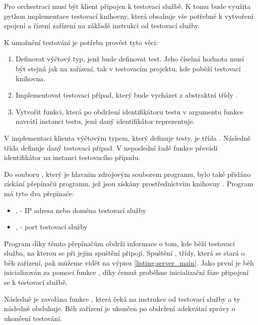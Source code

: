 Pro orchestraci musí být klient připojen k testovací službě. K tomu bude využita python implementace testovací knihovny, která obsahuje vše potřebné k vytvoření spojení a řízení zařízení na základě instrukcí od testovací služby. 

K umožnění testování je potřeba provést tyto věci:

\begin{enumerate}
    \item Definovat výčtový typ, jenž bude definovat test. Jeho číselná hodnota musí být stejná jak na zařízení, tak v testovacím projektu, kde poběží testovací knihovna.
    \item Implementovat testovací případ, který bude vycházet z abstraktní třídy .
    \item Vytvořit funkci, která po obdržení identifikátoru testu v argumentu funkce navrátí instanci testu, jenž daný identifikátor reprezentuje.
\end{enumerate}


V implementaci klienta výčtovým typem, který definuje testy, je třída . Následně třída  definuje daný testovací případ. V neposlední řadě funkce  převádí identifikátor na instanci testovacího případu. 

Do souboru , který je hlavním zdrojovým souborem programu, bylo také přidáno získání přepínačů programu, jež jsou získány prostřednictvím knihovny . Program má tyto dva přepínače:

\begin{itemize}
    \item {},  - IP adresa nebo doména testovací služby
    \item {},  - port testovací služby
\end{itemize}

Program díky těmto přepínačům obdrží informace o tom, kde běží testovací služba, na kterou se při jejím spuštění připojí. Spuštění , třídy, která se stará o běh zařízení, pak můžeme vidět na výpisu \ref{listing:server_main}. Jako první je běh inicializován za pomoci funkce , díky čemuž proběhne inicializační fáze připojení se k testovací službě. 

Následně je zavolána funkce , která čeká na instrukce od testovací služby a ty následně obsluhuje. Běh zařízení je ukončen po obdržení adekvátní zprávy o ukončení testování.

